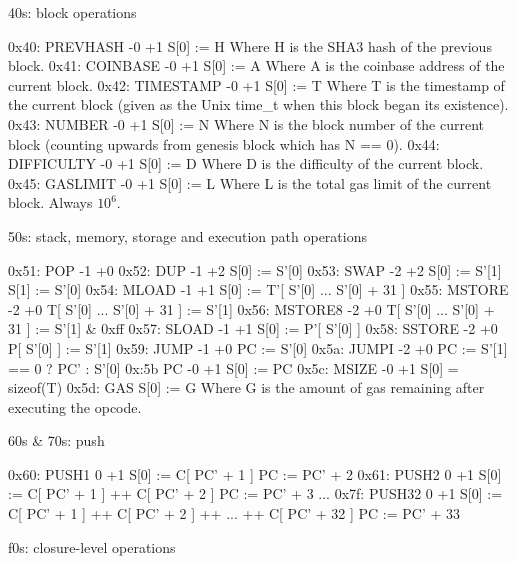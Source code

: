 \documentclass[9pt,oneside]{amsart}
\begin{document}
\begin{multicols}{2}
40s: block operations

0x40: PREVHASH -0 +1
S[0] := H
Where H is the SHA3 hash of the previous block.
0x41: COINBASE -0 +1
S[0] := A
Where A is the coinbase address of the current block.
0x42: TIMESTAMP -0 +1
S[0] := T
Where T is the timestamp of the current block (given as the Unix time\_t when this block began its existence).
0x43: NUMBER -0 +1
S[0] := N
Where N is the block number of the current block (counting upwards from genesis block which has N == 0).
0x44: DIFFICULTY -0 +1
S[0] := D
Where D is the difficulty of the current block.
0x45: GASLIMIT -0 +1
S[0] := L
Where L is the total gas limit of the current block. Always $10^6$.

50s: stack, memory, storage and execution path operations

0x51: POP -1 +0
0x52: DUP -1 +2
S[0] := S'[0]
0x53: SWAP -2 +2
S[0] := S'[1]
S[1] := S'[0]
0x54: MLOAD -1 +1
S[0] := T'[ S'[0] ... S'[0] + 31 ]
0x55: MSTORE -2 +0
T[ S'[0] ... S'[0] + 31 ] := S'[1]
0x56: MSTORE8 -2 +0
T[ S'[0] ... S'[0] + 31 ] := S'[1] \& 0xff
0x57: SLOAD -1 +1
S[0] := P'[ S'[0] ]
0x58: SSTORE -2 +0
P[ S'[0] ] := S'[1]
0x59: JUMP -1 +0
PC := S'[0]
0x5a: JUMPI -2 +0
PC := S'[1] == 0 ? PC' : S'[0]
0x:5b PC -0 +1
S[0] := PC
0x5c: MSIZE -0 +1
S[0] = sizeof(T)
0x5d: GAS
S[0] := G
Where G is the amount of gas remaining after executing the opcode.

60s \& 70s: push

0x60: PUSH1 0 +1
S[0] := C[ PC' + 1 ]
PC := PC' + 2
0x61: PUSH2 0 +1
S[0] := C[ PC' + 1 ] ++ C[ PC' + 2 ]
PC := PC' + 3
...
0x7f: PUSH32 0 +1
S[0] := C[ PC' + 1 ] ++ C[ PC' + 2 ] ++ ... ++ C[ PC' + 32 ]
PC := PC' + 33

f0s: closure-level operations


\end{multicols}
\end{document}
